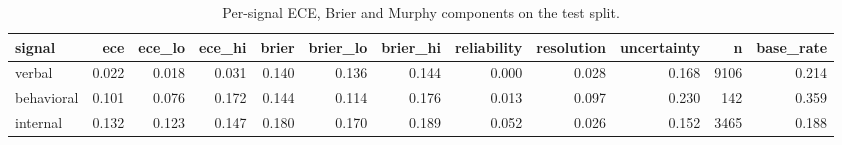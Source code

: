 \begin{table}
\caption{Per-signal ECE, Brier and Murphy components on the test split.}
\label{tab:t6_h1_murphy_decomposition}
\begin{tabular}{lrrrrrrrrrrr}
\toprule
signal & ece & ece\_lo & ece\_hi & brier & brier\_lo & brier\_hi & reliability & resolution & uncertainty & n & base\_rate \\
\midrule
verbal & 0.022 & 0.018 & 0.031 & 0.140 & 0.136 & 0.144 & 0.000 & 0.028 & 0.168 & 9106 & 0.214 \\
behavioral & 0.101 & 0.076 & 0.172 & 0.144 & 0.114 & 0.176 & 0.013 & 0.097 & 0.230 & 142 & 0.359 \\
internal & 0.132 & 0.123 & 0.147 & 0.180 & 0.170 & 0.189 & 0.052 & 0.026 & 0.152 & 3465 & 0.188 \\
\bottomrule
\end{tabular}
\end{table}
